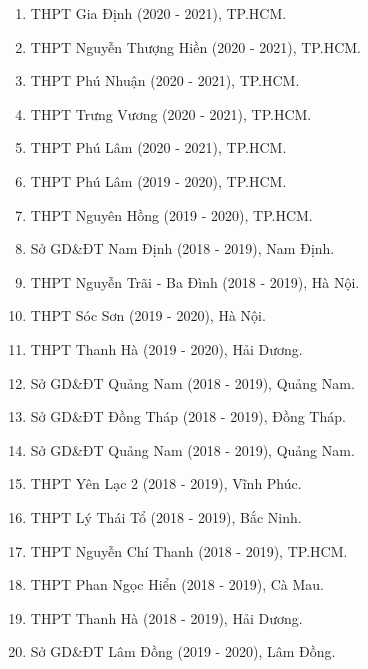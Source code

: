 \whiteBGstarBegin
\setcounter{section}{0}
\begin{enumerate}[label=\bfseries  \arabic*.]
	\item THPT Gia Định (2020 - 2021), TP.HCM.
	\item THPT Nguyễn Thượng Hiền (2020 - 2021), TP.HCM.
	\item THPT Phú Nhuận (2020 - 2021), TP.HCM.
	\item THPT Trưng Vương (2020 - 2021), TP.HCM.
	\item THPT Phú Lâm (2020 - 2021), TP.HCM.
	\item THPT Phú Lâm (2019 - 2020), TP.HCM.
	\item THPT Nguyên Hồng (2019 - 2020), TP.HCM.
	\item Sở GD\&ĐT Nam Định (2018 - 2019), Nam Định.
	\item THPT Nguyễn Trãi - Ba Đình (2018 - 2019), Hà Nội.
	\item THPT Sóc Sơn (2019 - 2020), Hà Nội.
	\item THPT Thanh Hà (2019 - 2020), Hải Dương.
	\item Sở GD\&ĐT Quảng Nam (2018 - 2019), Quảng Nam.
	\item Sở GD\&ĐT Đồng Tháp (2018 - 2019), Đồng Tháp.
	\item Sở GD\&ĐT Quảng Nam (2018 - 2019), Quảng Nam.
	\item THPT Yên Lạc 2 (2018 - 2019), Vĩnh Phúc.
	\item THPT Lý Thái Tổ (2018 - 2019), Bắc Ninh.
	\item THPT Nguyễn Chí Thanh (2018 - 2019), TP.HCM.
	\item THPT Phan Ngọc Hiển (2018 - 2019), Cà Mau.
	\item THPT Thanh Hà (2018 - 2019), Hải Dương.
	\item Sở GD\&ĐT Lâm Đồng (2019 - 2020), Lâm Đồng.	
\end{enumerate}